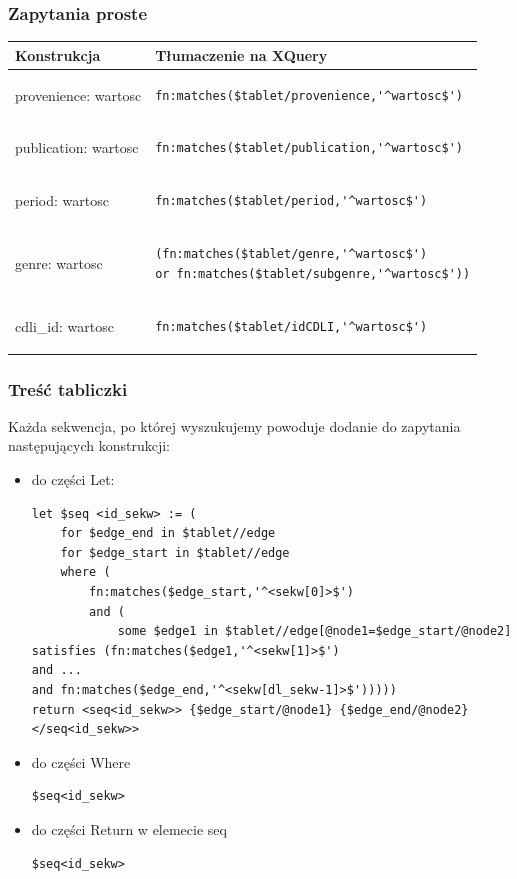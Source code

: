 \subsubsection{Zapytania proste}

\begin{longtable}{|p{2.5in}|p{3.5in}|}
\hline
{\bf Konstrukcja} & {\bf Tłumaczenie na XQuery}\\
\hline
\endhead
provenience: wartosc & \begin{verbatim}fn:matches($tablet/provenience,'^wartosc$')\end{verbatim}
\\
\hline
publication: wartosc & \begin{verbatim}fn:matches($tablet/publication,'^wartosc$')\end{verbatim}
\\
\hline
period: wartosc & \begin{verbatim}fn:matches($tablet/period,'^wartosc$')\end{verbatim}
\\
\hline
genre: wartosc & \begin{verbatim}(fn:matches($tablet/genre,'^wartosc$')
or fn:matches($tablet/subgenre,'^wartosc$'))\end{verbatim}
\\
\hline
cdli\_id: wartosc & \begin{verbatim}fn:matches($tablet/idCDLI,'^wartosc$')\end{verbatim}
\\
\hline
\end{longtable}


\subsubsection{Treść tabliczki}
Każda sekwencja, po której wyszukujemy powoduje dodanie do zapytania następujących konstrukcji:
\begin{itemize}
\item{do części Let:}
\begin{verbatim}
let $seq <id_sekw> := (
	for $edge_end in $tablet//edge
	for $edge_start in $tablet//edge
	where (
		fn:matches($edge_start,'^<sekw[0]>$')
		and (
			some $edge1 in $tablet//edge[@node1=$edge_start/@node2]
satisfies (fn:matches($edge1,'^<sekw[1]>$')
and ... 
and fn:matches($edge_end,'^<sekw[dl_sekw-1]>$')))))
return <seq<id_sekw>> {$edge_start/@node1} {$edge_end/@node2} </seq<id_sekw>>
\end{verbatim}
\item{do części Where}
\begin{verbatim}
$seq<id_sekw>
\end{verbatim}
\item{do części Return w elemecie seq}
\begin{verbatim}
$seq<id_sekw>
\end{verbatim}
\end{itemize}




